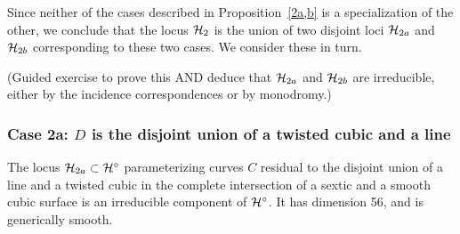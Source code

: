 Since neither of the cases described in Proposition~\ref{2a,b} is a specialization of the other, we conclude that the locus ${\cal H}_2$ is the union of two disjoint loci ${\cal H}_{2a}$ and ${\cal H}_{2b}$ corresponding to these two cases. We consider these in turn.


\begin{exercise}
(Guided exercise to prove this AND deduce that ${\cal H}_{2a}$ and ${\cal H}_{2b}$ are irreducible, either by the incidence correspondences or by monodromy.)
\end{exercise}


\subsubsection{Case 2a: $D$ is the disjoint union of a twisted cubic and a line}

\begin{proposition}
The locus ${\cal H}_{2a} \subset {\cal H}^\circ$ parameterizing curves $C$ residual to the disjoint union of a line and a twisted cubic  in the complete intersection of a sextic and a smooth cubic surface is an irreducible component of  ${\cal H}^\circ$. It has dimension 56, and is generically smooth.
\end{proposition} 
 
